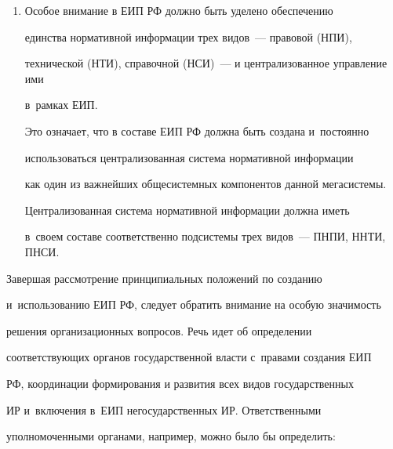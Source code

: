 \begin{enumerate}[1.]
осуществляется в~соответствии с~требованиями и методическими указаниями

стандартов, например комплекса стандартов на автоматизированные системы

ГОСТ серии~34. Такой подход, к~сожалению, не применим непосредственно

к~такому специфическому инфраструктурному образованию, как ЕИП РФ.

Учитывая важность документирования, ниже излагается подход

и~предложения по этой части.

     \item Особое внимание в ЕИП РФ должно быть уделено обеспечению

единства нормативной информации трех видов~--- правовой (НПИ),

технической (НТИ), справочной (НСИ)~--- и централизованное управление ими

в~рамках ЕИП.



     Это означает, что в составе ЕИП РФ должна быть создана и~постоянно

использоваться централизованная система нормативной информации

как один из важнейших общесистемных компонентов данной мегасистемы.

Централизованная система нормативной информации должна иметь

в~своем составе соответственно подсистемы трех видов~--- ПНПИ, ННТИ, ПНСИ.

     \end{enumerate}



     Завершая рассмотрение принципиальных положений по созданию

и~использованию ЕИП РФ, следует обратить внимание на особую значимость

решения организационных вопросов. Речь идет об определении

соответствующих органов государственной власти с~правами создания ЕИП

РФ, координации формирования и развития всех видов государственных

ИР и~включения в~ЕИП негосударственных ИР. Ответственными

уполномоченными органами, например, можно было бы определить:

